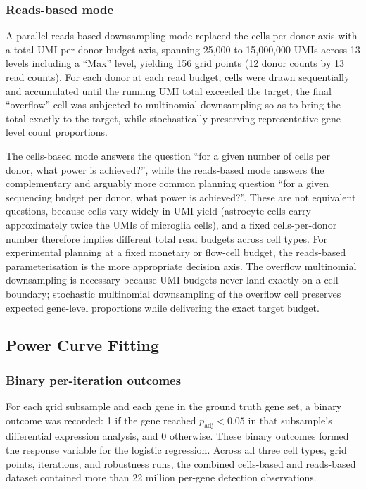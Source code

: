 \documentclass[
]{article}
\begin{document}
\subsubsection{Reads-based mode}\label{reads-based-mode}

A parallel reads-based downsampling mode replaced the cells-per-donor
axis with a total-UMI-per-donor budget axis, spanning 25,000 to
15,000,000 UMIs across 13 levels including a ``Max'' level, yielding 156
grid points (12 donor counts by 13 read counts). For each donor at each
read budget, cells were drawn sequentially and accumulated until the
running UMI total exceeded the target; the final ``overflow'' cell was
subjected to multinomial downsampling so as to bring the total exactly
to the target, while stochastically preserving representative gene-level
count proportions.

The cells-based mode answers the question ``for a given number of cells
per donor, what power is achieved?'', while the reads-based mode answers
the complementary and arguably more common planning question ``for a
given sequencing budget per donor, what power is achieved?''. These are
not equivalent questions, because cells vary widely in UMI yield
(astrocyte cells carry approximately twice the UMIs of microglia cells),
and a fixed cells-per-donor number therefore implies different total
read budgets across cell types. For experimental planning at a fixed
monetary or flow-cell budget, the reads-based parameterisation is the
more appropriate decision axis. The overflow multinomial downsampling is
necessary because UMI budgets never land exactly on a cell boundary;
stochastic multinomial downsampling of the overflow cell preserves
expected gene-level proportions while delivering the exact target
budget.

\subsection{Power Curve Fitting}\label{power-curve-fitting}

\subsubsection{Binary per-iteration
outcomes}\label{binary-per-iteration-outcomes}

For each grid subsample and each gene in the ground truth gene set, a
binary outcome was recorded: 1 if the gene reached
\(p_{\text{adj}} < 0.05\) in that subsample's differential expression
analysis, and 0 otherwise. These binary outcomes formed the response
variable for the logistic regression. Across all three cell types, grid
points, iterations, and robustness runs, the combined cells-based and
reads-based dataset contained more than 22 million per-gene detection
observations.
\end{document}
